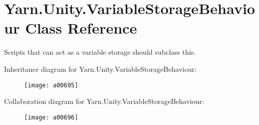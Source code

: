 \hypertarget{a00168}{\section{Yarn.\-Unity.\-Variable\-Storage\-Behaviour Class Reference}
\label{a00168}
}


Scripts that can act as a variable storage should subclass this.  




Inheritance diagram for Yarn.\-Unity.\-Variable\-Storage\-Behaviour\-:
\nopagebreak
\begin{figure}[H]
\begin{center}
\leavevmode
\texttt{[image: a00695]}
\end{center}
\end{figure}


Collaboration diagram for Yarn.\-Unity.\-Variable\-Storage\-Behaviour\-:
\nopagebreak
\begin{figure}[H]
\begin{center}
\leavevmode
\texttt{[image: a00696]}
\end{center}
\end{figure}

